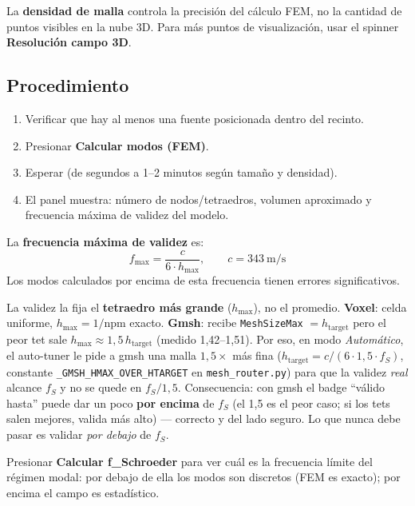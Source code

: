\documentclass[11pt, a4paper]{article}
\newenvironment{nota}[1][Nota]{%
  \begin{tcolorbox}[mybox=cBlue, title={#1}]%
}{\end{tcolorbox}}
\newenvironment{atención}[1][Atención]{%
  \begin{tcolorbox}[mybox=cOrange, title={#1}]%
}{\end{tcolorbox}}
\newcommand{\menu}[1]{\textbf{\guillemotleft #1\guillemotright}}
\begin{document}
\begin{atención}
  La \textbf{densidad de malla} controla la precisión del cálculo FEM,
  no la cantidad de puntos visibles en la nube 3D. Para más puntos de
  visualización, usar el spinner \menu{Resolución campo 3D}.
\end{atención}

\subsection{Procedimiento}

\begin{enumerate}[itemsep=3pt]
  \item Verificar que hay al menos una fuente posicionada dentro del recinto.
  \item Presionar \menu{Calcular modos (FEM)}.
  \item Esperar (de segundos a 1–2 minutos según tamaño y densidad).
  \item El panel muestra: número de nodos/tetraedros, volumen aproximado y
        frecuencia máxima de validez del modelo.
\end{enumerate}

La \textbf{frecuencia máxima de validez} es:
\[
  f_\text{max} = \frac{c}{6 \cdot h_\text{max}}, \qquad c = 343\ \text{m/s}
\]
Los modos calculados por encima de esta frecuencia tienen errores
significativos.

\begin{nota}[El peor tet define la validez de la malla]
La validez la fija el \textbf{tetraedro más grande} ($h_\text{max}$), no el
promedio. \textbf{Voxel}: celda uniforme, $h_\text{max} = 1/\text{npm}$ exacto.
\textbf{Gmsh}: recibe \texttt{MeshSizeMax} $= h_\text{target}$ pero el peor tet
sale $h_\text{max} \approx 1{,}5\,h_\text{target}$ (medido 1,42--1,51). Por eso,
en modo \emph{Automático}, el auto-tuner le pide a gmsh una malla $1{,}5\times$
más fina ($h_\text{target} = c/(6 \cdot 1{,}5 \cdot f_S)$, constante
\texttt{\_GMSH\_HMAX\_OVER\_HTARGET} en \texttt{mesh\_router.py}) para que la
validez \emph{real} alcance $f_S$ y no se quede en $f_S/1{,}5$. Consecuencia: con
gmsh el badge ``válido hasta'' puede dar un poco \textbf{por encima} de $f_S$
(el 1,5 es el peor caso; si los tets salen mejores, valida más alto) --- correcto
y del lado seguro. Lo que nunca debe pasar es validar \emph{por debajo} de $f_S$.
\end{nota}

\begin{nota}[Frecuencia de Schroeder]
  Presionar \menu{Calcular f\_Schroeder} para ver cuál es la frecuencia límite
  del régimen modal: por debajo de ella los modos son discretos (FEM es
  exacto); por encima el campo es estadístico.
\end{nota}
\end{document}
